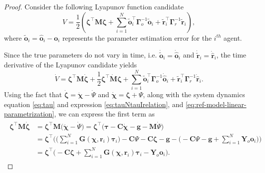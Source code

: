 \begin{proof}
    Consider the following Lyapunov function candidate
    \begin{equation}
        V = \frac{1}{2}\left( \boldsymbol{\zeta}^\top \mathbf {M} \boldsymbol{\zeta} + \sum _{i=1}^{N} \widetilde{\mathbf{o}}_i^\top \boldsymbol{\Gamma }_o^{-1}\widetilde{\mathbf{o}}_i + \widetilde{\mathbf{r}}_i^\top \boldsymbol{\Gamma }_r^{-1} \widetilde{\mathbf{r}}_i \right),
    \end{equation}
    where $\widetilde{\mathbf {o}}_i = \hat{\mathbf{o}}_i - \mathbf{o}_i$ represents the parameter estimation error for the $i^{th}$ agent.

    Since the true parameters do not vary in time, i.e. $\dot{\widetilde{\mathbf {o}}}_i = \dot{\hat{\mathbf{o}}}_i$ and $\dot{\widetilde{\mathbf {r}}}_i = \dot{\hat{\mathbf{r}}}_i$, the time derivative of the Lyapunov candidate yields
    \begin{equation}
        \dot{V} = \boldsymbol{\zeta}^\top \mathbf{M} \dot{\boldsymbol{\zeta}} + \frac{1}{2} \boldsymbol{\zeta}^\top \dot{\mathbf{M}} \boldsymbol{\zeta} + \sum\limits_{i=1}^{N} \widetilde{\mathbf{o}}_i^\top \boldsymbol{\Gamma}_o^{-1} \dot{\hat{\mathbf{o}}}_i + \widetilde{\mathbf{r}}_i^\top \boldsymbol{\Gamma}_r^{-1}\dot{\hat{\mathbf{r}}}_i.
        \label{eq:adaptive-lyapunov-derivative}
    \end{equation}
    Using the fact that $\dot{\boldsymbol{\zeta}} = \ddot{\boldsymbol{\chi}} - \dot{\Psi}$ and $\dot{\boldsymbol{\chi}} = \boldsymbol{\zeta} + \Psi$, along with the system dynamics equation \eqref{eq:tau} and expression \eqref{eq:tauNtauIrelation}, and \eqref{eq:ref-model-linear-parametrization}, we can express the first term as
    \begin{align} 
    \begin{split}
        \boldsymbol{\zeta}^\top \mathbf {M} \dot{\boldsymbol{\zeta}} &= \boldsymbol{\zeta}^\top\mathbf{M}\bigl(\ddot{\boldsymbol{\chi}} - \dot{\Psi}\bigr)
        = \boldsymbol{\zeta}^\top\bigl(\boldsymbol{\tau} - \mathbf{C}\dot{\boldsymbol{\chi}} - \mathbf{g} - \mathbf{M}\dot{\Psi}\bigr)\\
        &= \boldsymbol{\zeta}^\top\Biggl(\biggl(\sum_{i=1}^N\mathbf{G}(\boldsymbol{\chi}, \mathbf{r}_i)\boldsymbol{\tau}_i\biggr) -\mathbf{C}\Psi - \mathbf{C}\boldsymbol{\zeta} - \mathbf{g} - \biggl(-\mathbf{C}\Psi-\mathbf{g}+\sum_{i=1}^N\mathbf{Y}_o\mathbf{o}_i\biggr)\Biggr)\\
        &= \boldsymbol{\zeta}^\top\Biggl( - \mathbf{C}\boldsymbol{\zeta}+\sum_{i=1}^N\mathbf{G}(\boldsymbol{\chi}, \mathbf{r}_i)\boldsymbol{\tau}_i - \mathbf{Y}_o\mathbf{o}_i \Biggr).

\end{split}
\end{align}
\end{proof}
